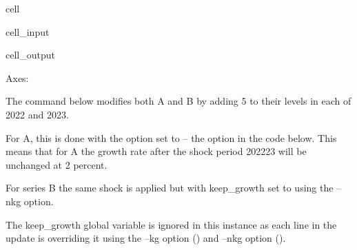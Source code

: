 \documentclass[letterpaper,10pt,english]{jupyterBook}
\begin{document}
\begin{sphinxuseclass}{cell}\begin{sphinxVerbatimInput}

\begin{sphinxuseclass}{cell_input}
\begin{sphinxVerbatim}[commandchars=\\\{\}]
\PYG{p}{[}\PYG{p}{[}\PYG{p}{]}\PYG{p}{]}
\end{sphinxVerbatim}

\end{sphinxuseclass}\end{sphinxVerbatimInput}
\begin{sphinxVerbatimOutput}

\begin{sphinxuseclass}{cell_output}
\begin{sphinxVerbatim}[commandchars=\\\{\}]
\PYGZlt{}Axes: \PYGZgt{}
\end{sphinxVerbatim}

\noindent{}

\end{sphinxuseclass}\end{sphinxVerbatimOutput}

\end{sphinxuseclass}
\sphinxAtStartPar
The  command below modifies both A and B by adding 5 to their levels in each of 2022 and 2023.

\sphinxAtStartPar
For A, this is done with the  option set to  – the  option in the code below.  This means that for A the growth rate after the shock period 2022\sphinxhyphen{}23 will be unchanged at 2 percent.

\sphinxAtStartPar
For series B the same shock is applied but with keep\_growth set to  using the –nkg option.

\sphinxAtStartPar
The keep\_growth global variable is ignored in this instance as each line in the update is overriding it using the –kg option () and –nkg option ().
\end{document}
